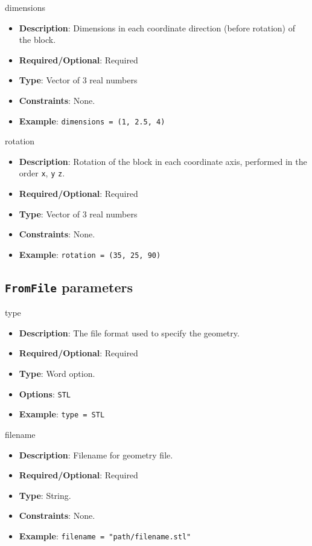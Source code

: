 dimensions
\vspace{\the\parameterListSpacing}
\begin{itemize}
    \item {\bf Description}: Dimensions in each coordinate direction (before rotation) of the block.
    \item {\bf Required/Optional}: Required
    \item {\bf Type}: Vector of 3 real numbers
    \item {\bf Constraints}: None.
    \item {\bf Example}: \lstinline!dimensions = (1, 2.5, 4)!
\end{itemize}

rotation
\vspace{\the\parameterListSpacing}
\begin{itemize}
    \item {\bf Description}: Rotation of the block in each coordinate axis, performed in the order \lstinline!x!, \lstinline!y! \lstinline!z!.
    \item {\bf Required/Optional}: Required
    \item {\bf Type}: Vector of 3 real numbers
    \item {\bf Constraints}: None.
    \item {\bf Example}: \lstinline!rotation = (35, 25, 90)!
\end{itemize}

\subsection*{ \lstinline!FromFile! parameters }

type
\vspace{\the\parameterListSpacing}
\begin{itemize}
    \item {\bf Description}: The file format used to specify the geometry.
    \item {\bf Required/Optional}: Required
    \item {\bf Type}: Word option.
    \item {\bf Options}: \lstinline!STL!
    \item {\bf Example}: \lstinline!type = STL!
\end{itemize}

filename
\vspace{\the\parameterListSpacing}
\begin{itemize}
    \item {\bf Description}: Filename for geometry file.
    \item {\bf Required/Optional}: Required
    \item {\bf Type}: String.
    \item {\bf Constraints}: None.
    \item {\bf Example}: \lstinline!filename = "path/filename.stl"!
\end{itemize}


